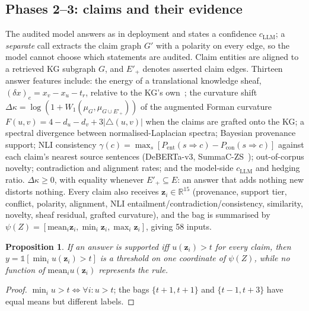 \documentclass[conference]{IEEEtran}
\newtheorem{proposition}{Proposition}
\newcommand{\R}{\mathbb{R}}
\begin{document}
\subsection{Phases 2--3: claims and their evidence}
The audited model answers as in deployment and states a confidence $c_{\mathrm{LLM}}$; a \emph{separate} call extracts
the claim graph $G'$ with a polarity on every edge, so the model cannot choose which statements are audited. Claim
entities are aligned to a retrieved KG subgraph $G$, and $E'_+$ denotes asserted claim edges. Thirteen answer features
include: the energy of a translational knowledge sheaf, $(\delta x)_e=x_v-x_u-t_r$, relative to the KG's
own~\cite{gebhart2023knowledge}; the curvature shift $\Delta\kappa=\log(1+W_1(\mu_G,\mu_{G\cup E'_+}))$ of the augmented
Forman curvature $F(u,v)=4-d_u-d_v+3|\triangle(u,v)|$ when the claims are grafted onto the KG; a spectral divergence
between normalised-Laplacian spectra; Bayesian provenance support; NLI consistency
$\gamma(c)=\max_s[P_{\mathrm{ent}}(s\Rightarrow c)-P_{\mathrm{con}}(s\Rightarrow c)]$ against each claim's nearest source
sentences (DeBERTa-v3, SummaC-ZS~\cite{laban2022summac}); out-of-corpus novelty; contradiction and alignment rates; and
the model-side $c_{\mathrm{LLM}}$ and hedging ratio. $\Delta\kappa\ge0$, with equality whenever $E'_+\subseteq E$: an answer
that adds nothing new distorts nothing. Every claim also receives $\bm z_i\in\R^{15}$ (provenance, support tier, conflict,
polarity, alignment, NLI entailment/contradiction/consistency, similarity, novelty, sheaf residual, grafted curvature),
and the bag is summarised by $\psi(Z)=[\mathrm{mean}_i\bm z_i,\min_i\bm z_i,\max_i\bm z_i]$, giving 58 inputs.
\begin{proposition}\label{prop:mi}
If an answer is supported iff $u(\bm z_i)>t$ for every claim, then $y=\mathbb 1[\min_iu(\bm z_i)>t]$ is a threshold on one
coordinate of $\psi(Z)$, while no function of $\mathrm{mean}_iu(\bm z_i)$ represents the rule.
\end{proposition}
\begin{proof}
$\min_iu>t\iff\forall i:u>t$; the bags $\{t{+}1,t{+}1\}$ and $\{t{-}1,t{+}3\}$ have equal means but different labels.
\end{proof}
\end{document}
